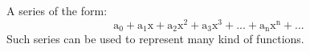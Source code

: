 A series of the form:
\[ \mathrm{a}_0 + \mathrm{a}_1 \mathrm{x} 
+ \mathrm{a}_2 \mathrm{x} ^2
+ \mathrm{a}_3 \mathrm{x} ^3
+ ...
+ \mathrm{a}_{\mathrm{n}} \mathrm{x} ^{\mathrm{n}}
+ ...
\]
Such series can be used to represent many kind of functions.